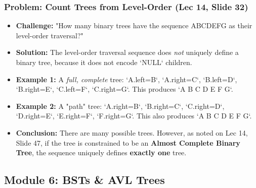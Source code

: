 \subsubsection{Problem: Count Trees from Level-Order (Lec 14, Slide 32)}
\begin{itemize}
    \item \textbf{Challenge:} "How many binary trees have the sequence ABCDEFG as their level-order traversal?"
    \item \textbf{Solution:} The level-order traversal sequence does \textit{not} uniquely define a binary tree, because it does not encode `NULL` children.
    \item \textbf{Example 1:} A \textit{full, complete} tree: `A.left=B`, `A.right=C`, `B.left=D`, `B.right=E`, `C.left=F`, `C.right=G`. This produces `A B C D E F G`.
    \item \textbf{Example 2:} A "path" tree: `A.right=B`, `B.right=C`, `C.right=D`, `D.right=E`, `E.right=F`, `F.right=G`. This also produces `A B C D E F G`.
    \item \textbf{Conclusion:} There are many possible trees. However, as noted on Lec 14, Slide 47, if the tree is constrained to be an \textbf{Almost Complete Binary Tree}, the sequence uniquely defines \textbf{exactly one} tree.
\end{itemize}

\subsection{Module 6: BSTs \& AVL Trees}

